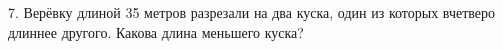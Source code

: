 7. Верёвку длиной 35 метров разрезали на два куска, один из которых вчетверо длиннее другого. Какова длина меньшего куска?\\
